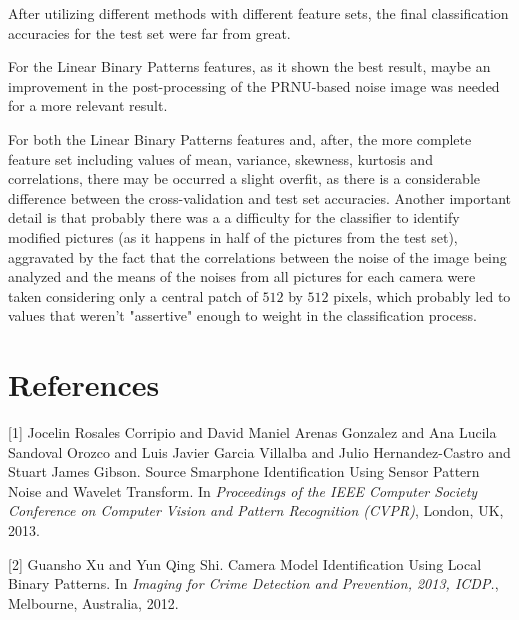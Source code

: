 \documentclass[10pt,twocolumn,letterpaper]{article}
\begin{document}
After utilizing different methods with different feature sets, the final classification accuracies for the test set were far from great.

For the Linear Binary Patterns features, as it shown the best result, maybe an improvement in the post-processing of the PRNU-based noise image was needed for a more relevant result. 

For both the Linear Binary Patterns features and, after, the more complete feature set including values of mean, variance, skewness, kurtosis and correlations, there may be occurred a slight overfit, as there is a considerable difference between the cross-validation and test set accuracies. Another important detail is that probably there was a a difficulty for the classifier to identify modified pictures (as it happens in half of the pictures from the test set), aggravated by the fact that the correlations between the noise of the image being analyzed and the means of the noises from all pictures for each camera were taken considering only a central patch of $512$ by $512$ pixels, which probably led to values that weren't "assertive" enough to weight in the classification process.
 
\section{References}

[1] Jocelin Rosales Corripio and David Maniel Arenas Gonzalez and Ana Lucila Sandoval Orozco and Luis Javier Garcia Villalba and Julio Hernandez-Castro and Stuart James Gibson. Source Smarphone Identification Using Sensor Pattern Noise and Wavelet Transform. In \textit{Proceedings of the IEEE Computer Society Conference on Computer Vision and Pattern Recognition (CVPR)}, London, UK, 2013.

[2] Guansho Xu and Yun Qing Shi. Camera Model Identification Using Local Binary Patterns. In \textit{Imaging for Crime Detection and Prevention, 2013, ICDP.}, Melbourne, Australia, 2012.
\end{document}
